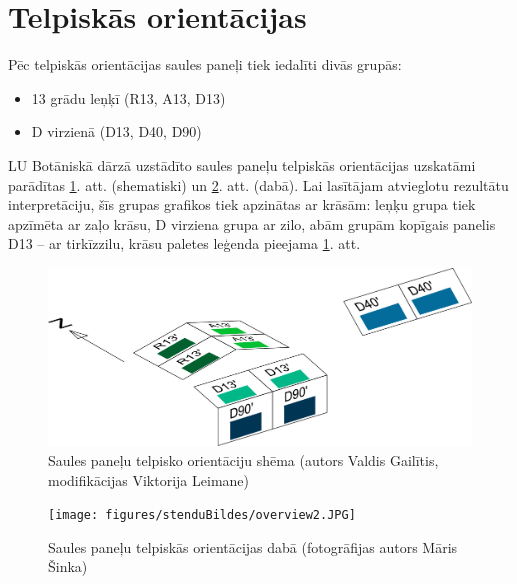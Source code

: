 \section{Telpiskās orientācijas}

Pēc telpiskās orientācijas saules paneļi tiek iedalīti divās grupās:
\begin{itemize}
\item 13 grādu leņķī (R13, A13, D13)
\item D virzienā (D13, D40, D90)
\end{itemize}

LU Botāniskā dārzā uzstādīto saules paneļu telpiskās orientācijas uzskatāmi parādītas \ref{fig:paneli}. att. (shematiski) un \ref{fig:paneli2}. att. (dabā). Lai lasītājam atvieglotu rezultātu interpretāciju, šīs grupas grafikos tiek apzinātas ar krāsām: leņķu grupa tiek apzīmēta ar zaļo krāsu, D virziena grupa ar zilo, abām grupām kopīgais panelis D13 -- ar tirkīzzilu, krāsu paletes leģenda pieejama \ref{fig:paneli}. att.


\begin{figure}[h]
    \centering
    \includegraphics[width=0.7\linewidth]{figures/misc/krasas_izvietojums.pdf}
    \caption{Saules paneļu telpisko orientāciju shēma (autors Valdis Gailītis, modifikācijas Viktorija Leimane)}
    \label{fig:paneli}
\end{figure}

\begin{figure}[h]
    \centering
    \texttt{[image: figures/stenduBildes/overview2.JPG]}
    \caption{Saules paneļu telpiskās orientācijas dabā (fotogrāfijas autors Māris Šinka)}
    \label{fig:paneli2}
\end{figure}